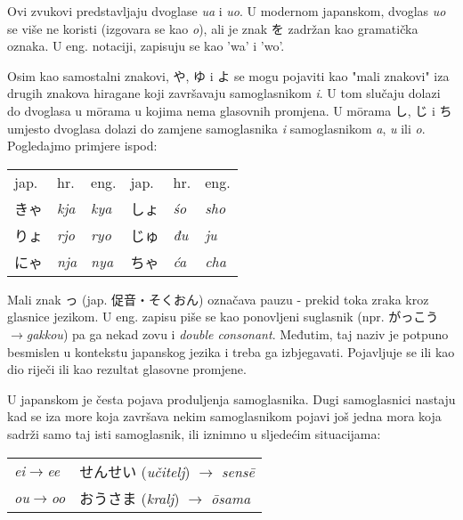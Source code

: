 	Ovi zvukovi predstavljaju dvoglase \textit{ua} i \textit{uo}. U modernom japanskom, dvoglas \textit{uo} se više ne koristi (izgovara se kao \textit{o}), ali je znak を zadržan kao gramatička oznaka. U eng. notaciji, zapisuju se kao 'wa' i 'wo'.
	
	
	Osim kao samostalni znakovi, や, ゆ i よ se mogu pojaviti kao "mali znakovi" iza drugih znakova hiragane koji završavaju samoglasnikom \textit{i}. U tom slučaju dolazi do dvoglasa\footnotemark[3] u m\={o}rama u kojima nema glasovnih promjena. U m\={o}rama し, じ i ち umjesto dvoglasa dolazi do zamjene samoglasnika \textit{i} samoglasnikom \textit{a}, \textit{u} ili \textit{o}. Pogledajmo primjere ispod:
	
	\begin{tabular}{l l l | l l l}
		jap.&hr.&eng.&jap.&hr.&eng.\\
		きゃ&\textit{kja}&\textit{kya}&しょ&\textit{\'{s}o}&\textit{sho}\\
		りょ&\textit{rjo}&\textit{ryo}&じゅ&\textit{đu}&\textit{ju}\\
		にゃ&\textit{nja}&\textit{nya}&ちゃ&\textit{ća}&\textit{cha}\\
	\end{tabular}

	
	Mali znak っ (jap. 促音・そくおん) označava pauzu - prekid toka zraka kroz glasnice jezikom. U eng. zapisu piše se kao ponovljeni suglasnik (npr. がっこう$\rightarrow$\textit{gakkou}) pa ga nekad zovu i \textit{double consonant}. Međutim, taj naziv je potpuno besmislen u kontekstu japanskog jezika i treba ga izbjegavati. Pojavljuje se ili kao dio riječi ili kao rezultat glasovne promjene.
	
	
	U japanskom je česta pojava produljenja samoglasnika. Dugi samoglasnici nastaju kad se iza more koja završava nekim samoglasnikom pojavi još jedna mora koja sadrži samo taj isti samoglasnik, ili iznimno u sljedećim situacijama:
	
	\vspace{5pt}
	\begin{tabular}{l l}
		\textit{ei}$\rightarrow$\textit{ee} & せんせい (\textit{učitelj}) $\rightarrow$ \textit{sens\={e}}\\
		\textit{ou}$\rightarrow$\textit{oo} & おうさま (\textit{kralj}) $\rightarrow$ \textit{\={o}sama}\\
	\end{tabular}

